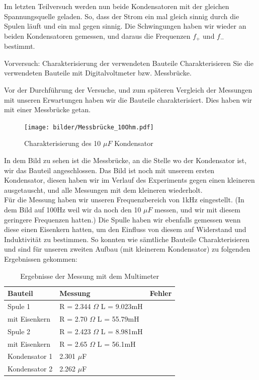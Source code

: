\documentclass[twoside]{protokoll}
\begin{document}
Im letzten Teilversuch werden nun beide Kondensatoren mit der gleichen Spannungsquelle geladen. 
So, dass der Strom ein mal gleich sinnig durch die Spulen läuft und ein mal gegen sinnig. Die Schwingungen haben wir wieder an beiden Kondensatoren gemessen, und daraus die Frequenzen $f_+$ und $f_-$ bestimmt. 
 

\begin{aufgabe}{Vorversuch: Charakterisierung der verwendeten Bauteile}
  Charakterisieren Sie die verwendeten Bauteile mit Digitalvoltmeter
  bzw. Messbrücke.
\end{aufgabe}

Vor der Durchführung der Versuche, und zum späteren Vergleich der Messungen mit unseren Erwartungen haben wir die Bauteile charakterisiert. Dies haben wir mit einer Messbrücke getan. 

\begin{figure}[H]
    \centering
    \texttt{[image: bilder/Messbrücke\_10Ohm.pdf]}
    \caption{Charakterisierung des 10 $\mu F$ Kondensator}
\end{figure}

In dem Bild zu sehen ist die Messbrücke, an die Stelle wo der Kondensator ist, wir das Bauteil angeschlossen. Das Bild ist noch mit unserem ersten Kondensator, diesen haben wir im Verlauf des Experiments gegen einen kleineren ausgetauscht, und alle Messungen mit dem kleineren wiederholt.\\

Für die Messung haben wir unseren Frequenzbereich von 1kHz eingestellt.
 (In dem Bild auf 100Hz weil wir da noch den 10 $\mu F$ messen, und wir mit diesem geringere Frequenzen hatten.) 
 Die Spulle haben wir ebenfalls gemessen wenn diese einen Eisenkern hatten, um den Einfluss von diesem auf Widerstand und Induktivität zu bestimmen.
So konnten wie sämtliche Bauteile Charakterisieren und sind für unseren zweiten Aufbau (mit kleinerem Kondensator) zu folgenden Ergebnissen gekommen:\\
    
\begin{table}[H]
        \centering
        \begin{tabularx}{0.8\textwidth}{X l c} %
            \toprule
            \textbf{Bauteil} & \textbf{Messung} & \textbf{Fehler} \\
            \midrule
            Spule 1 & R = 2.344 $\Omega$ \quad L = 9.023mH &  \\
            mit Eisenkern & R = 2.70 $\Omega$ \quad L = 55.79mH & \\
            \midrule
            Spule 2 & R = 2.423 $\Omega$ \quad L = 8.981mH &  \\
            mit Eisenkern & R = 2.65 $\Omega$ \quad L = 56.1mH&\\
            \midrule
            Kondensator 1 & 2.301 $\mu$F &  \\
            Kondensator 2 & 2.262 $\mu$F &  \\
            \bottomrule
        \end{tabularx}
        \caption{Ergebnisse der Messung mit dem Multimeter}
        \label{tab:mytable}
    \end{table}
\end{document}
